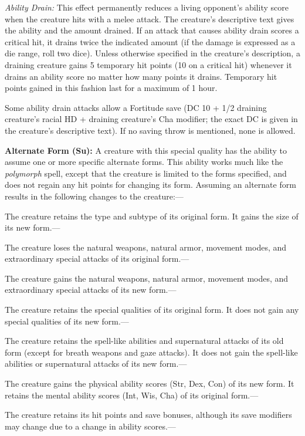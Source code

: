\documentclass{article}
\begin{document}
\textit{Ability Drain: }This effect permanently reduces a living opponent's ability 
score when the creature hits with a melee attack. The creature's descriptive text 
gives the ability and the amount drained. If an attack that causes ability drain 
scores a critical hit, it drains twice the indicated amount (if the damage is expressed 
as a die range, roll two dice). Unless otherwise specified in the creature's description, 
a draining creature gains 5 temporary hit points (10 on a critical hit) whenever 
it drains an ability score no matter how many points it drains. Temporary hit points 
gained in this fashion last for a maximum of 1 hour.

Some ability drain attacks allow a Fortitude save (DC 10 + 1/2 draining creature's 
racial HD + draining creature's Cha modifier; the exact DC is given in the creature's 
descriptive text). If no saving throw is mentioned, none is allowed.

\vspace{12pt}
\textbf{Alternate Form (Su):} A creature with this special quality has the ability 
to assume one or more specific alternate forms. This ability works much like the 
\textit{polymorph }spell, except that the creature is limited to the forms specified, 
and does not regain any hit points for changing its form. Assuming an alternate 
form results in the following changes to the creature:---

The creature retains the type and subtype of its original form. It gains the size 
of its new form.---

The creature loses the natural weapons, natural armor, movement modes, and extraordinary 
special attacks of its original form.---

The creature gains the natural weapons, natural armor, movement modes, and extraordinary 
special attacks of its new form.---

The creature retains the special qualities of its original form. It does not gain 
any special qualities of its new form.---

The creature retains the spell-like abilities and supernatural attacks of its old 
form (except for breath weapons and gaze attacks). It does not gain the spell-like 
abilities or supernatural attacks of its new form.---

The creature gains the physical ability scores (Str, Dex, Con) of its new form. 
It retains the mental ability scores (Int, Wis, Cha) of its original form.---

The creature retains its hit points and save bonuses, although its save modifiers 
may change due to a change in ability scores.---
\end{document}
